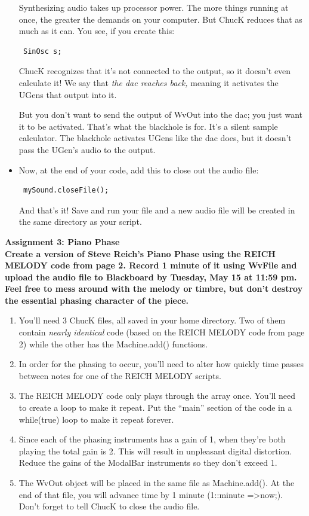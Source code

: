 \documentclass{article}
\begin{document}
\begin{itemize}
Synthesizing audio takes up processor power. The more things running at once, the greater the demands on your computer. But ChucK reduces that as much as it can. You see, if you create this:
\begin{lstlisting}
 SinOsc s;
\end{lstlisting}
ChucK recognizes that it's not connected to the output, so it doesn't even calculate it! We say that \textsl{the dac reaches back,} meaning it activates the UGens that output into it.

But you don't want to send the output of WvOut into the dac; you just want it to be activated. That's what the blackhole is for. It's a silent sample calculator. The blackhole activates UGens like the dac does, but it doesn't pass the UGen's audio to the output.

\item Now, at the end of your code, add this to close out the audio file:

\begin{lstlisting}
 mySound.closeFile();
\end{lstlisting}

And that's it! Save and run your file and a new audio file will be created in the same directory as your script.

\end{itemize}

\textbf{Assignment 3: Piano Phase}\vspace{2mm}
\\
\textbf{Create a version of Steve Reich's Piano Phase using the REICH MELODY code from page 2. Record 1 minute of it using WvFile and upload the audio file to Blackboard by Tuesday, May 15 at 11:59 pm. Feel free to mess around with the melody or timbre, but don't destroy the essential phasing character of the piece.}
\pagebreak
{}\vspace{2mm}
\\
\begin{enumerate}
\item You'll need 3 ChucK files, all saved in your home directory. Two of them contain \textsl{nearly identical} code (based on the REICH MELODY code from page 2) while the other has the Machine.add() functions.
\item In order for the phasing to occur, you'll need to alter how quickly time passes between notes for one of the REICH MELODY scripts.
\item The REICH MELODY code only plays through the array once. You'll need to create a loop to make it repeat. Put the ``main'' section of the code in a while(true) loop to make it repeat forever.
\item Since each of the phasing instruments has a gain of 1, when they're both playing the total gain is 2. This will result in unpleasant digital distortion. Reduce the gains of the ModalBar instruments so they don't exceed 1.
\item The WvOut object will be placed in the same file as Machine.add(). At the end of that file, you will advance time by 1 minute (1::minute =\textgreater now;). Don't forget to tell ChucK to close the audio file.
\end{enumerate}
\end{document}
